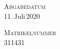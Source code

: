 \begin{titlepage}
\begin{flushleft}
\begin{multicols}{2}
            \columnbreak

            \textsc{Abgabedatum}\\
            11.\,Juli\,2020
            
            \vspace{0.3cm}

            \textsc{Matrikelnummer}\\
            311431

            \rmfamily

        \end{multicols}

    \end{flushleft}
\end{titlepage}
